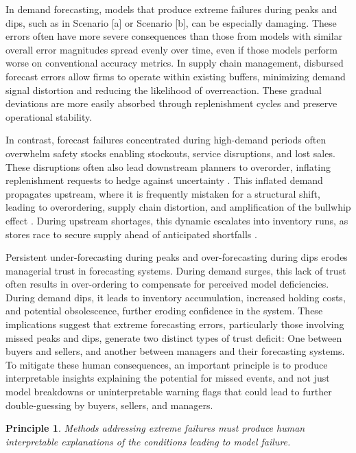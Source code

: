 \documentclass[preprint,12pt]{elsarticle}
\newtheorem{principle}{Principle}
\begin{document}
In demand forecasting, models that produce extreme failures during peaks and dips, such as in Scenario [a] or Scenario [b], can be especially damaging. These errors often have more severe consequences than those from models with similar overall error magnitudes spread evenly over time, even if those models perform worse on conventional accuracy metrics. In supply chain management, disbursed forecast errors allow firms to operate within existing buffers, minimizing demand signal distortion and reducing the likelihood of overreaction. These gradual deviations are more easily absorbed through  replenishment cycles and preserve operational stability. 

In contrast, forecast failures concentrated during high-demand periods often overwhelm safety stocks enabling stockouts, service disruptions, and lost sales. These disruptions often also lead downstream planners to overorder, inflating replenishment requests to hedge against uncertainty \citep{bray2019}. This inflated demand propagates upstream, where it is frequently mistaken for a structural shift, leading to overordering, supply chain distortion, and amplification of the bullwhip effect \citep{croson2014, wu2006}. During upstream shortages, this dynamic escalates into inventory runs, as stores race to secure supply ahead of anticipated shortfalls \citep{bray2019}. 
 
Persistent under-forecasting during peaks and over-forecasting during dips erodes managerial trust in forecasting systems. During demand surges, this lack of trust often results in over-ordering to compensate for perceived model deficiencies. During demand dips, it leads to inventory accumulation, increased holding costs, and potential obsolescence, further eroding confidence in the system. These implications suggest that extreme forecasting errors, particularly those involving missed peaks and dips, generate two distinct types of trust deficit: One between buyers and sellers, and another between managers and their forecasting systems. To mitigate these human consequences, an important principle is to produce interpretable insights explaining the potential for missed events, and not just model breakdowns or uninterpretable warning flags that could lead to further double-guessing by buyers, sellers, and managers.

\begin{principle}
\textit{Methods addressing extreme failures must produce human interpretable explanations of the conditions leading to model failure.}
\end{principle}
\end{document}
